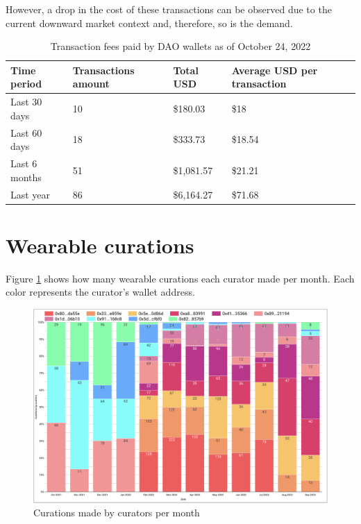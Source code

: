 \documentclass[MSE,Master,english]{twbook}%
\begin{document}
However, a drop in the cost of these transactions can be observed due to the current downward market context and, therefore, so is the demand.
\begin{center}
  \begin{table}[H]
    \begin{tabular}{ | m{8em} | m{10em} | m{6em} | m{15em} | }
      \hline
      \textbf{Time period} & \textbf{Transactions amount} & \textbf{Total USD} & \textbf{Average USD per transaction} \\ 
      \hline
      Last 30 days &	10 &	\$180.03 &	\$18 \\
      \hline
      Last 60 days &	18 &	\$333.73 &	\$18.54 \\
      \hline
      Last 6 months &	51 &	\$1,081.57 &	\$21.21 \\
      \hline
      Last year &	86 &	\$6,164.27 &	\$71.68 \\
      \hline
    \end{tabular}
    \caption{Transaction fees paid by \gls{DAO} wallets as of October 24, 2022}
    \label{table:fees}
  \end{table}
\end{center}

\section{Wearable curations}

Figure \ref{fig:curations} shows how many wearable curations each curator made per month. Each color represents the curator's wallet address.
\begin{figure}[H]
  \centering
  \includegraphics[width=\textwidth]{metrics/curations.png}
  \caption{Curations made by curators per month}
  \label{fig:curations}
\end{figure}
\end{document}
